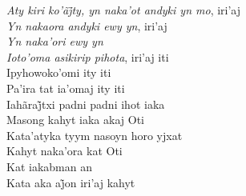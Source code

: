 \begin{linenumbers}\begingroup\raggedright
\noindent \textit{Aty kiri ko’ãj̃ty, yn naka’ot andyki yn mo}, iri’aj\\
\textit{Yn nakaora andyki ewy yn}, iri'aj\\
\textit{Yn naka'ori ewy yn}\\
\textit{Ioto'oma asikirip pihota}, iri'aj iti\\
Ipyhowoko'omi ity iti\\
Pa'ira tat ia'omaj ity iti\\
Iahãraj̃txi padni padni ihot iaka\\
Masong kahyt iaka akaj Oti\\
Kata'atyka tyym nasoyn horo yjxat\\
Kahyt naka'ora kat Oti\\
Kat iakabman an\\
Kata aka aj̃on iri’aj kahyt

\end{linenumbers}\endgroup

\bigskip

